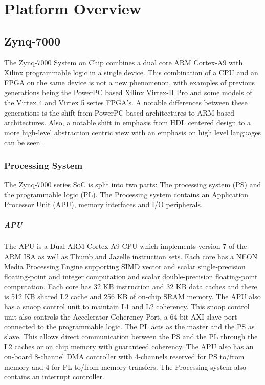 


\chapter{Platform Overview}

\section{Zynq-7000}

The Zynq-7000 System on Chip combines a dual core ARM Cortex-A9 with Xilinx programmable logic in a single device. This combination of a CPU and an FPGA on the same device is not a new phenomenon, with examples of previous generations being the PowerPC based Xilinx Virtex-II Pro and some models of the Virtex 4 and Virtex 5 series FPGA's. A notable differences between these generations is the shift from PowerPC based architectures to ARM based architectures. Also, a notable shift in emphasis from HDL centered design to a more high-level abstraction centric view with an emphasis on high level languages can be seen. 
	

	\subsection{Processing System}
	The Zynq-7000 series SoC is split into two parts: The processing system (PS) and the programmable logic (PL). The Processing system contains an Application Processor Unit (APU), memory interfaces and I/O peripherals. 
	
		\paragraph{APU}
		The APU is a Dual ARM Cortex-A9 CPU which implements version 7 of the ARM ISA  as well as Thumb and Jazelle instruction sets. Each core has a NEON Media Processing Engine supporting SIMD vector and scalar single-precision floating-point and integer computation and scalar double-precision floating-point computation. Each core has 32 KB instruction and 32 KB data caches and there is 512 KB shared L2 cache and 256 KB of on-chip SRAM memory. The APU also has a snoop control unit to maintain L1 and L2 coherency. This snoop control unit also controls the Accelerator Coherency Port, a 64-bit AXI slave port connected to the programmable logic. The PL acts as the master and the PS as slave. This allows direct communication between the PS and the PL through the L2 caches or on chip memory with guaranteed coherency. The APU also has an on-board 8-channel DMA controller with 4-channels reserved for PS to/from memory and 4 for PL to/from memory transfers. The Processing system also contains an interrupt controller.


